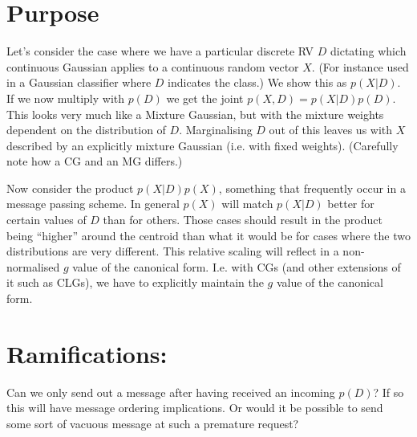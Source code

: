 \documentclass[oneside,english]{scrbook}
\begin{document}
\section{Purpose}
Let's consider the case where we have a particular discrete RV $D$
dictating which continuous Gaussian applies to a continuous random
vector $X$. (For instance used in a Gaussian classifier where $D$
indicates the class.) We show this as $p(X|D)$. If we now multiply
with $p(D)$ we get the joint $p(X,D)= p(X|D)p(D)$. This looks very
much like a Mixture Gaussian, but with the mixture weights dependent
on the distribution of $D$.  Marginalising $D$ out of this leaves us
with $X$ described by an explicitly mixture Gaussian (i.e. with fixed
weights).  (Carefully note how a CG and an MG differs.)

Now consider the product $p(X|D)p(X)$, something that frequently occur
in a message passing scheme. In general $p(X)$ will match $p(X|D)$
better for certain values of $D$ than for others. Those cases should
result in the product being ``higher'' around the centroid than what
it would be for cases where the two distributions are very different.
This relative scaling will reflect in a non-normalised $g$ value of
the canonical form. I.e. with CGs (and other extensions of it such as
CLGs), we have to explicitly maintain the $g$ value of the canonical
form.

\section{Ramifications:}
Can we only send out a message after having received an incoming
$p(D)$? If so this will have message ordering implications.  Or would
it be possible to send some sort of vacuous message at such a
premature request?
\end{document}
